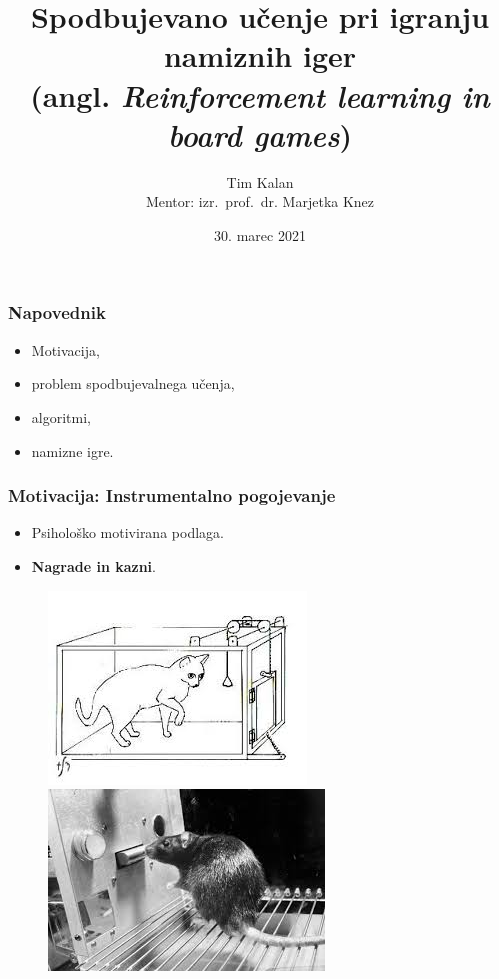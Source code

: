 \documentclass{beamer}    %
\author{Tim Kalan \\ \medskip
        \footnotesize Mentor: izr.~prof.~dr. Marjetka Knez}
\institute[FMF]{Fakulteta za matematiko in fiziko}
\title{
    Spodbujevano učenje pri igranju namiznih iger \\ 
    \large (angl. \textit{Reinforcement learning in board games})}
\date{30. marec 2021}
\begin{document}
\begin{frame}
    \titlepage
\end{frame}


\begin{frame}
    \frametitle{Napovednik}
    \begin{itemize}
        \item Motivacija, 
        \item problem spodbujevalnega učenja, 
        \item algoritmi, 
        \item namizne igre.
    \end{itemize}
\end{frame}


\begin{frame}
    \frametitle{Motivacija: Instrumentalno pogojevanje}
    \begin{itemize}
        \item Psihološko motivirana podlaga. 
        \item \textbf{Nagrade in kazni}.
    \end{itemize}

    \begin{figure}[b]
        \includegraphics[scale=0.47]{slike/macka.jpg}
        \includegraphics[scale=0.5]{slike/miska.jpg}
    \end{figure}
            
\end{frame}
\end{document}
